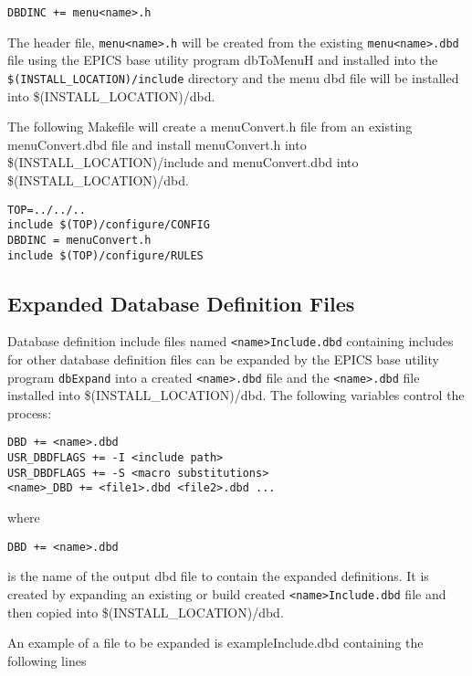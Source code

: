 \begin{verbatim}
DBDINC += menu<name>.h
\end{verbatim}

The header file, \verb|menu<name>.h| will be created from the existing \verb|menu<name>.dbd| file using the EPICS base utility 
program dbToMenuH and installed into the \verb|$(INSTALL_LOCATION)/include| directory and the menu dbd file will be 
installed into \$(INSTALL\_LOCATION)/dbd.

The following Makefile will create a menuConvert.h file from an existing menuConvert.dbd file and install 
menuConvert.h into \$(INSTALL\_LOCATION)/include and menuConvert.dbd into \$(INSTALL\_LOCATION)/dbd.

\begin{verbatim}
TOP=../../..
include $(TOP)/configure/CONFIG
DBDINC = menuConvert.h
include $(TOP)/configure/RULES
\end{verbatim}

\subsection{Expanded Database Definition Files}

Database definition include files named \verb|<name>Include.dbd| containing includes for other database definition files can be 
expanded by the EPICS base utility program \verb|dbExpand| into a created \verb|<name>.dbd| file and the \verb|<name>.dbd| file installed 
into \$(INSTALL\_LOCATION)/dbd. The following variables control the process:

\begin{verbatim}
DBD += <name>.dbd
USR_DBDFLAGS += -I <include path>
USR_DBDFLAGS += -S <macro substitutions>
<name>_DBD += <file1>.dbd <file2>.dbd ...
\end{verbatim}

where 

\begin{verbatim}
DBD += <name>.dbd
\end{verbatim}

is the name of the output dbd file to contain the expanded definitions. It is created by expanding an existing or build          
created \verb|<name>Include.dbd| file and then copied into \$(INSTALL\_LOCATION)/dbd.

An example of a file to be expanded is exampleInclude.dbd containing the following lines

